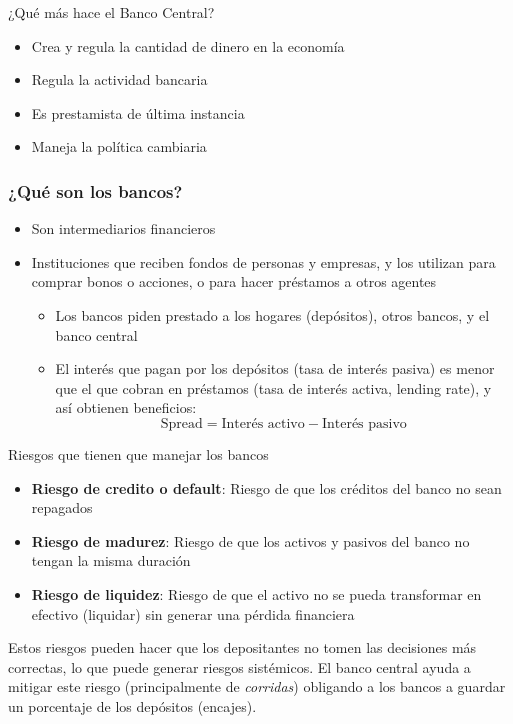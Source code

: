 \documentclass{beamer}
\begin{document}
\begin{frame}{¿Qué más hace el Banco Central?}
    \begin{itemize}
        \item Crea y regula la cantidad de dinero en la economía
        \item Regula la actividad bancaria
        \item Es prestamista de última instancia
        \item Maneja la política cambiaria 
    \end{itemize}
\end{frame}

\begin{frame}
\frametitle{¿Qué son los bancos?}
\begin{itemize}
    \item Son intermediarios financieros
    \item Instituciones que reciben fondos de personas y empresas, y los utilizan para comprar bonos o acciones, o para hacer préstamos a otros agentes
    \begin{itemize}
        \item Los bancos piden prestado a los hogares (depósitos), otros bancos, y el banco central \\
        \item El interés que pagan por los depósitos (tasa de interés pasiva) es menor que el que cobran en préstamos (tasa de interés activa, lending rate), y así obtienen beneficios:
        \[ \text{Spread} = \text{Interés activo} - \text{Interés pasivo} \]
    \end{itemize}
\end{itemize}
\end{frame}

\begin{frame}{Riesgos que tienen que manejar los bancos}
    \begin{itemize}
        \item \textbf{Riesgo de credito o default}: Riesgo de que los créditos del banco no sean repagados
        \item \textbf{Riesgo de madurez}: Riesgo de que los activos y pasivos del banco no tengan la misma duración
        \item \textbf{Riesgo de liquidez}: Riesgo de que el activo no se pueda transformar en efectivo (liquidar) sin generar una pérdida financiera
    \end{itemize}
    Estos riesgos pueden hacer que los depositantes no tomen las decisiones más correctas, lo que puede generar riesgos sistémicos. El banco central ayuda a mitigar este riesgo (principalmente de \textit{corridas}) obligando a los bancos a guardar un porcentaje de los depósitos (encajes). 
\end{frame}
\end{document}
